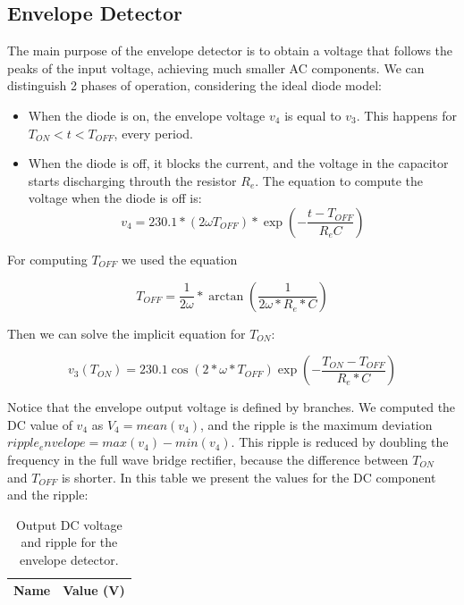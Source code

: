 \subsection{Envelope Detector}
\label{subsec:env}

\par The main purpose of the envelope detector is to obtain a voltage that follows the peaks of the input voltage, achieving much smaller AC components. We can distinguish 2 phases of operation, considering the ideal diode model:

\begin{itemize}
  \item When the diode is on, the envelope voltage $v_4$ is equal to $v_3$. This happens for $T_{ON}<t<T_{OFF}$, every period. 
  \item When the diode is off, it blocks the current, and the voltage in the capacitor starts discharging throuth the resistor $R_e$. The equation to compute the voltage when the diode is off is:
\begin{equation}
  v_4=230.1*(2\omega T_{OFF})*\exp{(-\frac{t-T_{OFF}}{R_eC})}
\end{equation}
\end{itemize}

 \par For computing $T_{OFF}$ we used the equation
 
  \begin{equation}
T_{OFF}=\frac{1}{2\omega}*\arctan(\frac{1}{2\omega*R_e*C})
  \label{eq:toff}
  \end{equation}
\par Then we can solve the implicit equation for $T_{ON}$:

\begin{equation}
v_3(T_{ON})=230.1\cos(2*\omega*T_{OFF})\exp{(-\frac{T_{ON}-T_{OFF}}{R_e*C})}
  \label{eq:ton}
\end{equation}

\par Notice that the envelope output voltage is defined by branches. We computed the DC value of $v_4$ as $V_4=mean(v_4)$, and the ripple is the maximum deviation $ripple_envelope=max(v_4)-min(v_4)$. This ripple is reduced by doubling the frequency in the full wave bridge rectifier, because the difference between $T_{ON}$ and $T_{OFF}$ is shorter. In this table we present the values for the DC component and the ripple:

\begin{table}[H]
    \centering
    \begin{tabular}{|l|r|}
    \hline    
    {\bf Name} & {\bf Value (V)} \\ \hline
    
    \end{tabular}
     \caption{Output DC voltage and ripple for the envelope detector.}
    \label{tab:env}
  \end{table}


